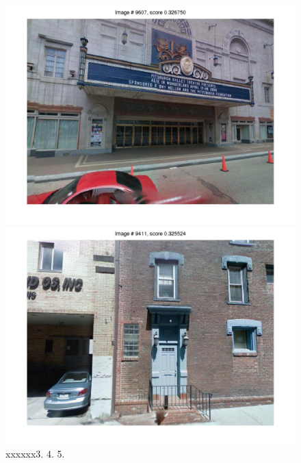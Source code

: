 \documentclass[10pt,onecolumn,A4]{article}
\begin{document}
\begin{figure}
\begin{minipage}{0.45\linewidth}
		\colorbox{myGreen}{\includegraphics[trim = 55mm 40mm 55mm 30mm, clip=true,width=0.30\linewidth]{sup2569/svm04.jpg}}
		\colorbox{myCopper5}{\includegraphics[trim = 55mm 40mm 55mm 30mm, clip=true,width=0.30\linewidth]{sup2569/svm05.jpg}}  \\
		\textcolor{myWhite}{xxxxxx}3. \hspace{0.25\linewidth}4. \hspace{0.25\linewidth}5. \\
	\end{minipage}
\end{figure}
\end{document}
